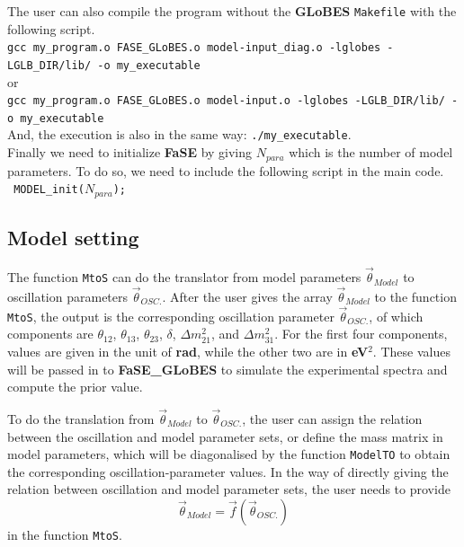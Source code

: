 \documentclass[aps,prd,nofootinbib,preprint]{revtex4}
\begin{document}
The user can also compile the program without the \textbf{GLoBES} \texttt{Makefile} with the following script.\vspace{0.2cm}\\
\texttt{gcc my\_program.o FASE\_GLoBES.o model-input\_diag.o -lglobes -LGLB\_DIR/lib/ -o my\_executable}\\
or\\
\texttt{gcc my\_program.o FASE\_GLoBES.o model-input.o -lglobes -LGLB\_DIR/lib/ -o my\_executable}\vspace{0.2cm}\\
And, the execution is also in the same way: \texttt{./my\_executable}.\\

Finally we need to initialize \textbf{FaSE} by giving $N_{para}$ which is the number of model parameters. To do so, we need to include the following script in the main code.\\
\texttt{    MODEL\_init($N_{para}$); }\vspace{0.2cm}\\ 

\subsection{Model setting}\label{sec:model_set}

The function \texttt{MtoS} can do the translator from model parameters $\vec{\theta}_{Model}$ to oscillation parameters $\vec{\theta}_{OSC.}$. After the user gives the array $\vec{\theta}_{Model}$ to the function \texttt{MtoS}, the output is the corresponding oscillation parameter $\vec{\theta}_{OSC.}$, of which components are $\theta_{12}$, $\theta_{13}$, $\theta_{23}$, $\delta$, $\Delta m_{21}^2$, and $\Delta m_{31}^2$. For the first four components, values are given in the unit of \textbf{rad}, while the other two are in \textbf{eV$^2$}. These values will be passed in to \textbf{FaSE\_GLoBES} to simulate 
the experimental spectra and compute the prior value.


To do the translation from $\vec{\theta}_{Model}$ to $\vec{\theta}_{OSC.}$, the user can assign the relation between the oscillation and model parameter sets, or define the mass matrix in model parameters, which will be diagonalised by the function \texttt{ModelTO} to obtain the corresponding oscillation-parameter values. 
In the way of directly giving the relation between oscillation and model parameter sets, the user needs to provide
\begin{equation}\label{eq:modelofOSC}
\vec{\theta}_{Model}=\vec{f}(\vec{\theta}_{OSC.})
\end{equation}
 in the function \texttt{MtoS}.
%
\end{document}
